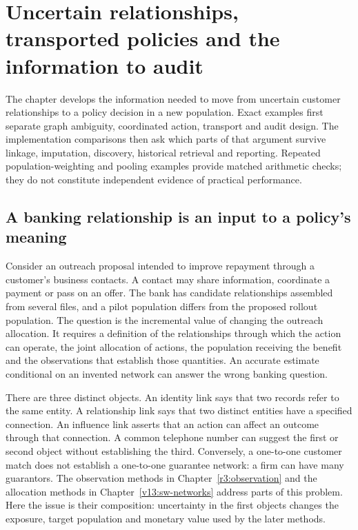 \chapter{Uncertain relationships, transported policies and the information to audit}
\label{exec17:s7}

The chapter develops the information needed to move from uncertain customer
relationships to a policy decision in a new population. Exact examples first
separate graph ambiguity, coordinated action, transport and audit design. The
implementation comparisons then ask which parts of that argument survive
linkage, imputation, discovery, historical retrieval and reporting. Repeated
population-weighting and pooling examples provide matched arithmetic checks;
they do not constitute independent evidence of practical performance.

\section{A banking relationship is an input to a policy's meaning}
\label{exec17:s7-question}

Consider an outreach proposal intended to improve repayment through a customer's
business contacts. A contact may share information, coordinate a payment or pass
on an offer. The bank has candidate relationships assembled from several files,
and a pilot population differs from the proposed rollout population. The question
is the incremental value of changing the outreach allocation. It requires a
definition of the relationships through which the action can operate, the joint
allocation of actions, the population receiving the benefit and the observations
that establish those quantities. An accurate estimate conditional on an invented
network can answer the wrong banking question.

There are three distinct objects. An identity link says that two records refer
to the same entity. A relationship link says that two distinct entities have a
specified connection. An influence link asserts that an action can affect an
outcome through that connection. A common telephone number can suggest the first
or second object without establishing the third. Conversely, a one-to-one
customer match does not establish a one-to-one guarantee network: a firm can have
many guarantors. The observation methods in Chapter~\ref{r3:observation} and the
allocation methods in Chapter~\ref{v13:sw-networks} address parts of this problem.
Here the issue is their composition: uncertainty in the first objects changes
the exposure, target population and monetary value used by the later methods.

